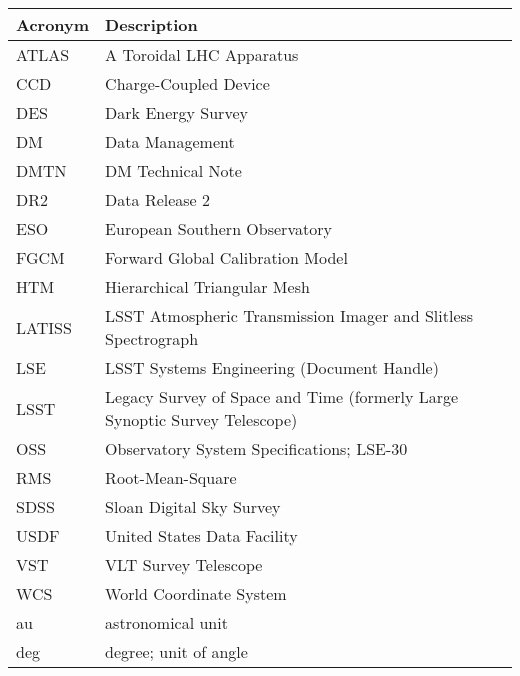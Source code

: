 \addtocounter{table}{-1}
\begin{longtable}{p{}p{}}\hline
\textbf{Acronym} & \textbf{Description}  \\\hline

ATLAS & A Toroidal LHC Apparatus \\\hline
CCD & Charge-Coupled Device \\\hline
DES & Dark Energy Survey \\\hline
DM & Data Management \\\hline
DMTN & DM Technical Note \\\hline
DR2 & Data Release 2 \\\hline
ESO & European Southern Observatory \\\hline
FGCM & Forward Global Calibration Model \\\hline
HTM & Hierarchical Triangular Mesh \\\hline
LATISS & LSST Atmospheric Transmission Imager and Slitless Spectrograph \\\hline
LSE & LSST Systems Engineering (Document Handle) \\\hline
LSST & Legacy Survey of Space and Time (formerly Large Synoptic Survey Telescope) \\\hline
OSS & Observatory System Specifications; LSE-30 \\\hline
RMS & Root-Mean-Square \\\hline
SDSS & Sloan Digital Sky Survey \\\hline
USDF & United States Data Facility \\\hline
VST & VLT Survey Telescope \\\hline
WCS & World Coordinate System \\\hline
au & astronomical unit \\\hline
deg & degree; unit of angle \\\hline
\end{longtable}
